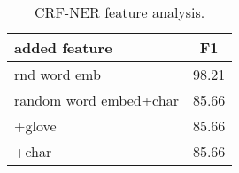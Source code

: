 \documentclass[11pt]{article}
\begin{document}
\begin{table}
\begin{center}
\begin{tabular}{l|c}
\hline 
added feature & F1 \\ 
\hline 
rnd word emb & 98.21 \\
random word embed+char   & 85.66 \\

+glove     & 85.66 \\
+char     & 85.66 \\


\end{tabular} 
\caption{CRF-NER feature analysis.}
\end{center}
\label{perf}
\end{table}




\end{document}

